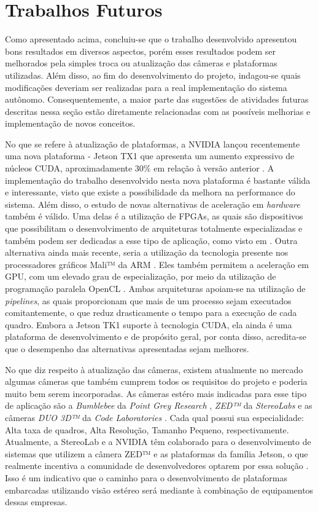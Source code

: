 \section{Trabalhos Futuros}

Como apresentado acima, concluiu-se que o trabalho desenvolvido apresentou bons resultados em diversos aspectos, porém esses resultados podem ser melhorados pela simples troca ou atualização das câmeras e plataformas utilizadas. Além disso, ao fim do desenvolvimento do projeto, indagou-se quais modificações deveriam ser realizadas para a real implementação do sistema autônomo. Consequentemente, a maior parte das sugestões de atividades futuras descritas nessa seção estão diretamente relacionadas com as possíveis melhorias e implementação de novos conceitos.

No que se refere à atualização de plataformas, a NVIDIA lançou recentemente uma nova plataforma - Jetson TX1 que apresenta um aumento expressivo de núcleos CUDA, aproximadamente 30\% em relação à versão anterior \cite{JetsonTX1}. A implementação do trabalho desenvolvido nesta nova plataforma é bastante válida e interessante, visto que existe a possibilidade da melhora na performance do sistema. Além disso, o estudo de novas alternativas de aceleração em \textit{hardware} também é válido. Uma delas é a utilização de FPGAs, as quais são dispositivos que possibilitam o desenvolvimento de arquiteturas totalmente especializadas e também podem ser dedicadas a esse tipo de aplicação, como visto em \cite{Barry2015}. Outra alternativa ainda mais recente, seria a utilização da tecnologia presente nos processadores gráficos Mali™ da ARM \textregistered. Eles também permitem a aceleração em GPU, com um elevado grau de especialização, por meio da utilização de programação paralela OpenCL \cite{StereoARM}. Ambas arquiteturas apoiam-se na utilização de \textit{pipelines}, as quais proporcionam que mais de um processo sejam executados comitantemente, o que reduz drasticamente o tempo para a execução de cada quadro. Embora a Jetson TK1 suporte à tecnologia CUDA, ela ainda é uma plataforma de desenvolvimento e de propósito geral, por conta disso, acredita-se que o desempenho das alternativas apresentadas sejam melhores.

No que diz respeito à atualização das câmeras, existem atualmente no mercado algumas câmeras que também cumprem todos os requisitos do projeto e poderia muito bem serem incorporadas. As câmeras estéro mais indicadas para esse tipo de aplicação são a \textit{Bumblebee} da \textit{Point Grey Research} \cite{bumblebee2}, \textit{ZED™} da \textit{StereoLabs} \cite{StereoLabsZED} e as câmeras \textit{DUO 3D™} da \textit{Code Laboratories} \cite{CodeLaboratoriesDUO}. Cada qual possui sua especialidade: Alta taxa de quadros, Alta Resolução, Tamanho Pequeno, respectivamente. Atualmente, a StereoLab e a NVIDIA têm colaborado para o desenvolvimento de sistemas que utilizem a câmera ZED™ e as plataformas da família Jetson, o que realmente incentiva a comunidade de desenvolvedores optarem por essa solução \cite{NVIDIAStereoLabsPartenership}. Isso é um indicativo que o caminho para o desenvolvimento de plataformas embarcadas utilizando visão estéreo será mediante à combinação de equipamentos dessas empresas.

